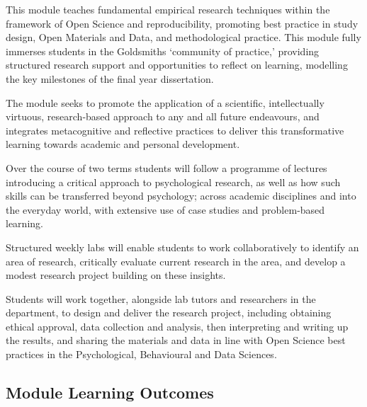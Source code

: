 \documentclass[
  11pt,
  letterpaper,
  oneside,
  open=any]{scrbook}
\begin{document}
This module teaches fundamental empirical research techniques within the
framework of Open Science and reproducibility, promoting best practice
in study design, Open Materials and Data, and methodological practice.
This module fully immerses students in the Goldsmiths `community of
practice,' providing structured research support and opportunities to
reflect on learning, modelling the key milestones of the final year
dissertation.

The module seeks to promote the application of a scientific,
intellectually virtuous, research-based approach to any and all future
endeavours, and integrates metacognitive and reflective practices to
deliver this transformative learning towards academic and personal
development.

Over the course of two terms students will follow a programme of
lectures introducing a critical approach to psychological research, as
well as how such skills can be transferred beyond psychology; across
academic disciplines and into the everyday world, with extensive use of
case studies and problem-based learning.

Structured weekly labs will enable students to work collaboratively to
identify an area of research, critically evaluate current research in
the area, and develop a modest research project building on these
insights.

Students will work together, alongside lab tutors and researchers in the
department, to design and deliver the research project, including
obtaining ethical approval, data collection and analysis, then
interpreting and writing up the results, and sharing the materials and
data in line with Open Science best practices in the Psychological,
Behavioural and Data Sciences.

\hypertarget{module-learning-outcomes-1}{%
\subsection{Module Learning Outcomes}\label{module-learning-outcomes-1}}
\end{document}
